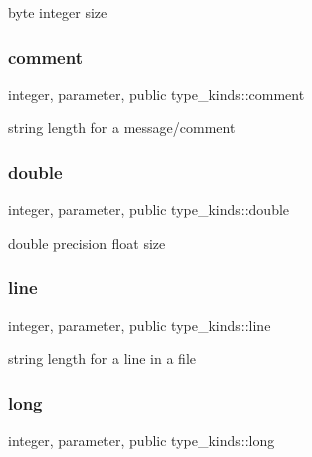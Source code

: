 byte integer size 

\mbox{\label{namespacetype__kinds_abb1584a815b1c1b79301d6f922366eec}} 
\subsubsection{\texorpdfstring{comment}{comment}}
{\footnotesize\ttfamily integer, parameter, public type\+\_\+kinds\+::comment}



string length for a message/comment 

\mbox{\label{namespacetype__kinds_a34b12277eb02d1bbaaaae83e033d9890}} 
\subsubsection{\texorpdfstring{double}{double}}
{\footnotesize\ttfamily integer, parameter, public type\+\_\+kinds\+::double}



double precision float size 

\mbox{\label{namespacetype__kinds_af0560ef37c612847670ffbfba8a9bc33}} 
\subsubsection{\texorpdfstring{line}{line}}
{\footnotesize\ttfamily integer, parameter, public type\+\_\+kinds\+::line}



string length for a line in a file 

\mbox{\label{namespacetype__kinds_a14af3c9d56db49c61252b056506a584a}} 
\subsubsection{\texorpdfstring{long}{long}}
{\footnotesize\ttfamily integer, parameter, public type\+\_\+kinds\+::long}



